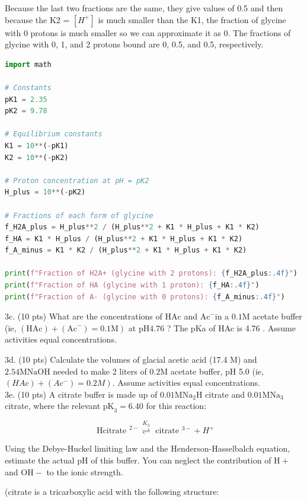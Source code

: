 \documentclass[12pt]{article}
\begin{document}
Because the last two fractions are the same, they give values of 0.5 and then because the K2 = $[H^+]$ is much smaller than the K1, the fraction of glycine with 0 protons is much smaller so we can approximate it as 0. The fractions of glycine with 0, 1, and 2 protons bound are 0, 0.5, and 0.5, respectively.
\begin{lstlisting}[language=Python]
import math

# Constants
pK1 = 2.35
pK2 = 9.78

# Equilibrium constants
K1 = 10**(-pK1)
K2 = 10**(-pK2)

# Proton concentration at pH = pK2
H_plus = 10**(-pK2)

# Fractions of each form of glycine
f_H2A_plus = H_plus**2 / (H_plus**2 + K1 * H_plus + K1 * K2)
f_HA = K1 * H_plus / (H_plus**2 + K1 * H_plus + K1 * K2)
f_A_minus = K1 * K2 / (H_plus**2 + K1 * H_plus + K1 * K2)

print(f"Fraction of H2A+ (glycine with 2 protons): {f_H2A_plus:.4f}")
print(f"Fraction of HA (glycine with 1 proton): {f_HA:.4f}")
print(f"Fraction of A- (glycine with 0 protons): {f_A_minus:.4f}")
\end{lstlisting}


3c. (10 pts) What are the concentrations of $\mathrm{HAc}$ and $\mathrm{Ac}^{-}$in a $0.1 \mathrm{M}$ acetate buffer (ie, $\left.(\mathrm{HAc})+\left(\mathrm{Ac}^{-}\right)=0.1 \mathrm{M}\right)$ at $\mathrm{pH} 4.76$ ? The pKa of HAc is 4.76 . Assume activities equal concentrations.

3d. (10 pts) Calculate the volumes of glacial acetic acid (17.4 M) and $2.54 \mathrm{M} \mathrm{NaOH}$ needed to make 2 liters of $0.2 \mathrm{M}$ acetate buffer, pH 5.0 (ie, $\left.(H A c)+\left(A c^{-}\right)=0.2 M\right)$. Assume activities equal concentrations.\\
3e. (10 pts) A citrate buffer is made up of $0.01 \mathrm{M} \mathrm{Na}_{2} \mathrm{H}$ citrate and $0.01 \mathrm{M} \mathrm{Na}_{3}$ citrate, where the relevant $\mathrm{pK}_{3}=6.40$ for this reaction:

$$
\text { Hcitrate }^{2-} \stackrel{K_{3}}{\rightleftharpoons} \text { citrate }^{3-}+H^{+}
$$

Using the Debye-Huckel limiting law and the Henderson-Hasselbalch equation, estimate the actual $\mathrm{pH}$ of this buffer. You can neglect the contribution of $\mathrm{H}+$ and $\mathrm{OH}-$ to the ionic strength.

(citrate is a tricarboxylic acid with the following structure:
\end{document}
